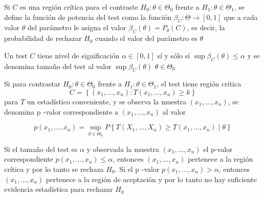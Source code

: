 \begin{definición} 
Si $C$ es una región crítica para el contraste $H_{0}: \theta \in \Theta_{0}$ frente a $H_{1}: \theta \in \Theta_{1}$, se define la función de potencia del test como la función $\beta_{C}: \Theta \rightarrow[0,1]$ que a cada valor $\theta$ del parámetro le asigna el valor $\beta_{C}(\theta)=P_{\theta}(C)$, es decir, la probabilidad de rechazar $H_{0}$ cuando el valor del parámetro es $\theta$
\end{definición}

\begin{definición} 
Un test $C$ tiene nivel de significación $\alpha \in[0,1]$ sí y sólo sí $\sup \beta_{C}(\theta) \leq \alpha$ y se denomina tamaño del test al valor $\sup \beta_{C}(\theta)$ $\theta \in \Theta_{0}$
\end{definición}


\begin{definición} [p-valor]
 Si para contrastar $H_{0}: \theta \in \Theta_{0}$ frente a $H_{1}: \theta \in \Theta_{1}$, el test tiene región crítica 
 $$C=\left\{\left(x_{1}, \ldots, x_{n}\right): T\left(x_{1}, \ldots, x_{n}\right) \geq k\right\}$$
 para $T$ un estadístico conveniente, y se observa la muestra $\left(x_{1}, \ldots, x_{n}\right)$, se denomina p -valor correspondiente a $\left(x_{1}, \ldots, x_{n}\right)$ al valor

$$
p\left(x_{1}, \ldots, x_{n}\right)=\sup _{\theta \in \Theta_{0}} P\left\{T\left(X_{1}, \ldots, X_{n}\right) \geq T\left(x_{1}, \ldots, x_{n}\right) \mid \theta\right\}
$$

Si el tamaño del test es $\alpha$ y observada la muestra $\left(x_{1}, \ldots, x_{n}\right)$ el p-valor correspondiente $p\left(x_{1}, \ldots, x_{n}\right) \leq \alpha$, entonces $\left(x_{1}, \ldots, x_{n}\right)$ pertenece a la región crítica y por lo tanto se rechaza $H_{0}$. Si el p -valor $p\left(x_{1}, \ldots, x_{n}\right)>\alpha$, entonces $\left(x_{1}, \ldots, x_{n}\right)$ pertenece a la región de aceptación y por lo tanto no hay suficiente evidencia estadística para rechazar $H_{0}$
\end{definición}

